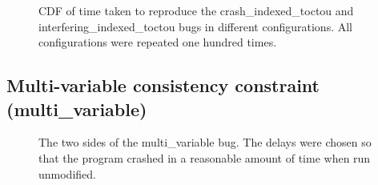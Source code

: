 \begin{figure}
  
  \caption{CDF of time taken to reproduce the crash\_indexed\_toctou
    and interfering\_indexed\_toctou bugs in different configurations.
    All configurations were repeated one hundred times.}
  \label{fig:biassed_indexed_toctou:times}
\end{figure}

\subsection{Multi-variable consistency constraint (multi\_variable)}

\begin{figure}
  \hfill
  \caption{The two sides of the multi\_variable bug. The delays were
    chosen so that the program crashed in a reasonable amount of time
    when run unmodified.}
  \label{fig:eval:multi_variable}
\end{figure}


